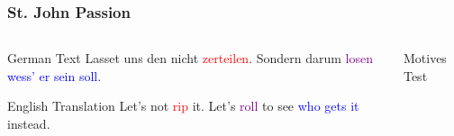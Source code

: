 	\begin{frame}
		\frametitle{St. John Passion}
		\begin{columns}[t]
		
		\begin{column}{0.5\textwidth}
		\begin{block}{German Text}
		Lasset uns den nicht \textcolor{red}{zerteilen}. Sondern darum \textcolor{purple}{losen} \textcolor{blue}{wess' er sein soll}.
		\end{block}
	
		\begin{block}{English Translation}
			Let's not \textcolor{red}{rip} it. Let's \textcolor{purple}{roll} to see \textcolor{blue}{who gets it} instead.
		\end{block}
		\end{column}
	
	
	\begin{column}{0.5\textwidth}
		\begin{block}{Motives}
			Test
		\end{block}
	\end{column}
	
	\end{columns}
		
	\end{frame}